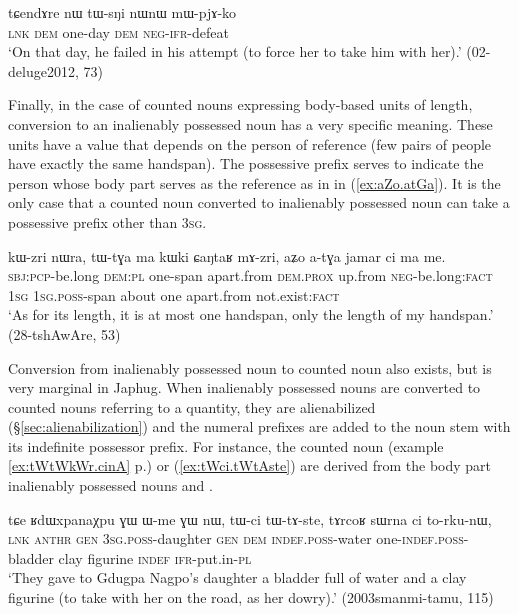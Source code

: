 \begin{exe}
\ex \label{ex:nW.tWsNi}
\gll tɕendɤre nɯ tɯ-sŋi nɯnɯ mɯ-pjɤ-ko \\
\textsc{lnk} \textsc{dem} one-day \textsc{dem} \textsc{neg}-\textsc{ifr}-defeat \\
\glt `On that day, he failed in his attempt (to force her to take him with her).' (02-deluge2012, 73)
\end{exe}

Finally, in the case of counted nouns expressing body-based units of length, conversion to an inalienably possessed noun has a very specific meaning.  These units have a value that depends on the person of reference (few pairs of people have exactly the same handspan). The possessive prefix serves to indicate the person whose body part serves as the reference as in  in (\ref{ex:aZo.atGa}). It is the only case that a counted noun converted to inalienably possessed noun can take a possessive prefix other than \textsc{3sg}.

\begin{exe}
\ex \label{ex:aZo.atGa}
\gll kɯ-zri nɯra, tɯ-tɣa ma kɯki ɕaŋtaʁ mɤ-zri, aʑo a-tɣa jamar ci ma me. \\
 \textsc{sbj}:\textsc{pcp}-be.long \textsc{dem}:\textsc{pl} one-span apart.from \textsc{dem}.\textsc{prox} up.from \textsc{neg}-be.long:\textsc{fact} \textsc{1sg} \textsc{1sg}.\textsc{poss}-span about one apart.from not.exist:\textsc{fact} \\
\glt `As for its length, it is at most one handspan, only the length of my handspan.' (28-tshAwAre, 53)
\end{exe}

Conversion from inalienably possessed noun to counted noun also exists, but is very marginal in Japhug. When inalienably possessed nouns are converted to counted nouns referring to a quantity, they are alienabilized (§\ref{sec:alienabilization}) and the numeral prefixes are added to the noun stem with its indefinite possessor prefix. For instance, the counted noun  (example \ref{ex:tWtWkWr.cinA} p.\pageref{ex:tWtWkWr.cinA}) or  (\ref{ex:tWci.tWtAste}) are derived from the body part inalienably possessed nouns  and . 

\begin{exe}
\ex \label{ex:tWci.tWtAste}
\gll  tɕe ʁdɯxpanaχpu ɣɯ ɯ-me ɣɯ nɯ, tɯ-ci tɯ-tɤ-ste, tɤrcoʁ sɯrna ci to-rku-nɯ, \\
 \textsc{lnk}  \textsc{anthr} \textsc{gen} \textsc{3sg}.\textsc{poss}-daughter \textsc{gen} \textsc{dem} \textsc{indef}.\textsc{poss}-water one-\textsc{indef}.\textsc{poss}-bladder clay figurine \textsc{indef} \textsc{ifr}-put.in-\textsc{pl} \\
\glt `They gave to Gdugpa Nagpo's daughter a bladder full of water and a clay figurine (to take with her on the road, as her dowry).' (2003smanmi-tamu, 115)
\end{exe}

